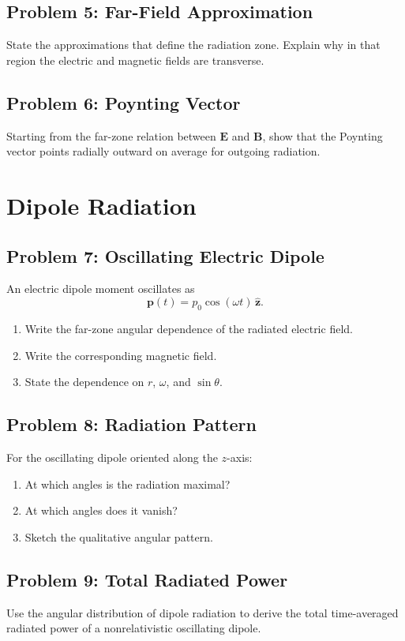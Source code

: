 \documentclass[hidelinks]{article}
\begin{document}
\subsection{Problem 5: Far-Field Approximation}
State the approximations that define the radiation zone. Explain why in that region the electric and magnetic fields are transverse.

\subsection{Problem 6: Poynting Vector}
Starting from the far-zone relation between $\mathbf{E}$ and $\mathbf{B}$, show that the Poynting vector points radially outward on average for outgoing radiation.

\section{Dipole Radiation}
\subsection{Problem 7: Oscillating Electric Dipole}
An electric dipole moment oscillates as
\[
\mathbf{p}(t)=p_0\cos(\omega t)\,\hat{\mathbf{z}}.
\]
\begin{enumerate}[label=\alph*)]
\item Write the far-zone angular dependence of the radiated electric field.
\item Write the corresponding magnetic field.
\item State the dependence on $r$, $\omega$, and $\sin\theta$.
\end{enumerate}

\subsection{Problem 8: Radiation Pattern}
For the oscillating dipole oriented along the $z$-axis:
\begin{enumerate}[label=\alph*)]
\item At which angles is the radiation maximal?
\item At which angles does it vanish?
\item Sketch the qualitative angular pattern.
\end{enumerate}

\subsection{Problem 9: Total Radiated Power}
Use the angular distribution of dipole radiation to derive the total time-averaged radiated power of a nonrelativistic oscillating dipole.
\end{document}
